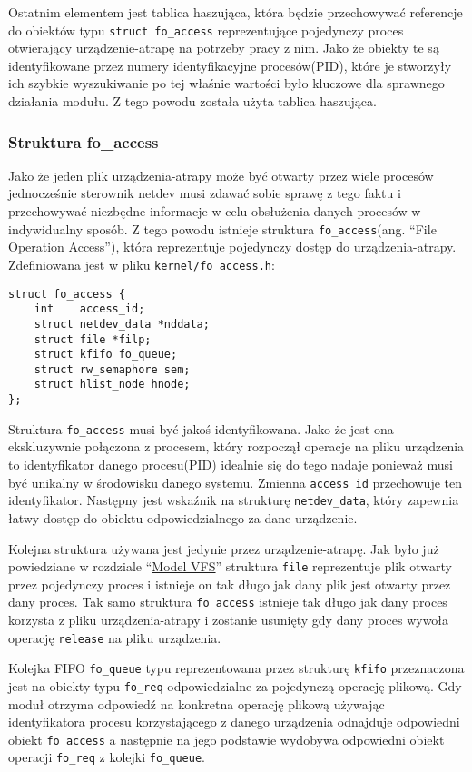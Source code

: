 Ostatnim elementem jest tablica haszująca, która będzie przechowywać
referencje do obiektów typu \texttt{struct fo\_access} reprezentujące
pojedynczy proces otwierający urządzenie-atrapę na potrzeby pracy z nim.
Jako że obiekty te są identyfikowane przez numery identyfikacyjne
procesów(PID), które je stworzyły ich szybkie wyszukiwanie po tej
właśnie wartości było kluczowe dla sprawnego działania modułu. Z tego
powodu została użyta tablica haszująca.

\subsubsection{Struktura fo\_access}

Jako że jeden plik urządzenia-atrapy może być otwarty przez wiele
procesów jednocześnie sterownik netdev musi zdawać sobie sprawę z tego
faktu i przechowywać niezbędne informacje w celu obsłużenia danych
procesów w indywidualny sposób. Z tego powodu istnieje struktura
\texttt{fo\_access}(ang. ``File Operation Access''), która reprezentuje
pojedynczy dostęp do urządzenia-atrapy. Zdefiniowana jest w pliku
\texttt{kernel/fo\_access.h}:

\begin{verbatim}
struct fo_access {
    int    access_id;
    struct netdev_data *nddata;
    struct file *filp;
    struct kfifo fo_queue;
    struct rw_semaphore sem;
    struct hlist_node hnode;
};
\end{verbatim}

Struktura \texttt{fo\_access} musi być jakoś identyfikowana. Jako że
jest ona ekskluzywnie połączona z procesem, który rozpoczął operacje na
pliku urządzenia to identyfikator danego procesu(PID) idealnie się do
tego nadaje ponieważ musi być unikalny w środowisku danego systemu.
Zmienna \texttt{access\_id} przechowuje ten identyfikator. Następny jest
wskaźnik na strukturę \texttt{netdev\_data}, który zapewnia łatwy dostęp
do obiektu odpowiedzialnego za dane urządzenie.

Kolejna struktura używana jest jedynie przez urządzenie-atrapę. Jak było
już powiedziane w rozdziale ``\hyperref[model-vfs]{Model VFS}''
struktura \texttt{file} reprezentuje plik otwarty przez pojedynczy
proces i istnieje on tak długo jak dany plik jest otwarty przez dany
proces. Tak samo struktura \texttt{fo\_access} istnieje tak długo jak
dany proces korzysta z pliku urządzenia-atrapy i zostanie usunięty gdy
dany proces wywoła operację \texttt{release} na pliku urządzenia.

Kolejka FIFO \texttt{fo\_queue} typu reprezentowana przez strukturę
\texttt{kfifo} przeznaczona jest na obiekty typu \texttt{fo\_req}
odpowiedzialne za pojedynczą operację plikową. Gdy moduł otrzyma
odpowiedź na konkretna operację plikową używając identyfikatora procesu
korzystającego z danego urządzenia odnajduje odpowiedni obiekt
\texttt{fo\_access} a następnie na jego podstawie wydobywa odpowiedni
obiekt operacji \texttt{fo\_req} z kolejki \texttt{fo\_queue}.

